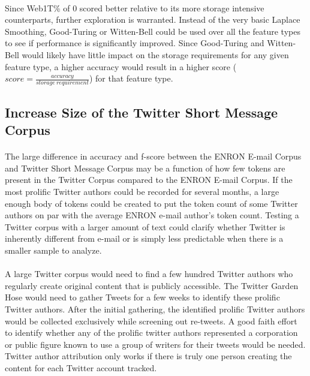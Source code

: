 	\paragraph*{} Since Web1T\% of 0 scored better relative to its more storage intensive counterparts, further exploration is warranted.  Instead of the very basic Laplace Smoothing, Good-Turing or Witten-Bell could be used over all the feature types to see if performance is significantly improved.  Since Good-Turing and Witten-Bell would likely have little impact on the storage requirements for any given feature type, a higher accuracy would result in a higher score ($score=\frac{accuracy}{storage \medspace requirement}$) for that feature type.

	\subsection{Increase Size of the Twitter Short Message Corpus}
		\paragraph*{} The large difference in accuracy and f-score between the ENRON E-mail Corpus and Twitter Short Message Corpus may be a function of how few tokens are present in the Twitter Corpus compared to the ENRON E-mail Corpus.  If the most prolific Twitter authors could be recorded for several months, a large enough body of tokens could be created to put the token count of some Twitter authors on par with the average ENRON e-mail author's token count.  Testing a Twitter corpus with a larger amount of text could clarify whether Twitter is inherently different from e-mail or is simply less predictable when there is a smaller sample to analyze.
		\paragraph*{} A large Twitter corpus would need to find a few hundred Twitter authors who regularly create original content that is publicly accessible.  The Twitter Garden Hose would need to gather Tweets for a few weeks to identify these prolific Twitter authors.  After the initial gathering, the identified prolific Twitter authors would be collected exclusively while screening out re-tweets.  A good faith effort to identify whether any of the prolific twitter authors represented a corporation or public figure known to use a group of writers for their tweets would be needed.  Twitter author attribution only works if there is truly one person creating the content for each Twitter account tracked.
